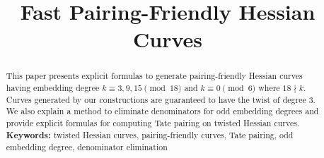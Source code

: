 \documentclass[11pt,runningheads]{llncs}
\newif\ifpublic
\begin{document}
\title{Fast Pairing-Friendly Hessian Curves}

\ifpublic
\author{Chitchanok Chuengsatiansup}

\institute{
Department of Mathematics and Computer Science\\
Technische Universiteit Eindhoven\\
P.O. Box 513, 5600 MB Eindhoven, The Netherlands\\
\email{c.chuengsatiansup@tue.nl}
}
\fi
\maketitle
\begin{abstract}
This paper presents explicit formulas to generate pairing-friendly Hessian curves
having embedding degree $k \equiv 3,9,15 \pmod{18}$ and $k \equiv 0 \pmod{6}$ where $18 \nmid k$.
Curves generated by our constructions are guaranteed to have the twist of degree 3.
We also explain a method to eliminate denominators for odd embedding degrees
and provide explicit formulas for computing Tate pairing on twisted Hessian curves.
\\[10pt]
\textbf{Keywords:}
twisted Hessian curves, pairing-friendly curves, Tate pairing, odd embedding degree, denominator elimination
\end{abstract}












\end{document}
